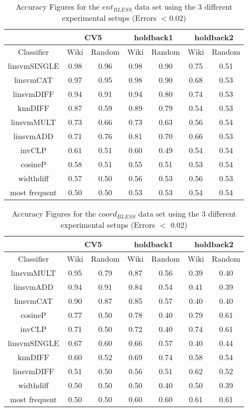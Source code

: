 \documentclass[11pt]{article}
\begin{document}
\begin{table*}[ht]
\centering
\begin{tabular}{|c|c|c|c|c|c|c|}
\hline
&\multicolumn{2}{|c|}{CV5}&\multicolumn{2}{|c|}{holdback1}&\multicolumn{2}{|c|}{holdback2}\\
\hline
Classifier&Wiki&Random&Wiki&Random&Wiki&Random\\
\hline
linsvmSINGLE&0.98&0.96&0.98&0.90&0.75&0.51\\
linsvmCAT&0.97&0.95&0.98&0.90&0.68&0.53\\
linsvmDIFF&0.94&0.91&0.94&0.80&0.74&0.53\\
knnDIFF&0.87&0.59&0.89&0.79&0.54&0.53\\
linsvmMULT&0.73&0.66&0.73&0.63&0.56&0.54\\
linsvmADD&0.71&0.76&0.81&0.70&0.66&0.53\\
invCLP&0.61&0.51&0.60&0.49&0.54&0.54\\
cosineP&0.58&0.51&0.55&0.51&0.53&0.54\\
widthdiff&0.57&0.50&0.56&0.53&0.56&0.53\\
most frequent&0.50&0.50&0.53&0.53&0.54&0.54\\
\hline
\end{tabular}
\caption{Accuracy Figures for the \emph{$ent_{BLESS}$} data set using the 3 different experimental setups (Errors $< $0.02)}
\label{table:results_ent_bless}
\end{table*}

\begin{table*}[ht]
\centering
\begin{tabular}{|c|c|c|c|c|c|c|}
\hline
&\multicolumn{2}{|c|}{CV5}&\multicolumn{2}{|c|}{holdback1}&\multicolumn{2}{|c|}{holdback2}\\
\hline
Classifier&Wiki&Random&Wiki&Random&Wiki&Random\\
\hline
linsvmMULT&0.95&0.79&0.87&0.56&0.39&0.40\\
linsvmADD&0.94&0.91&0.84&0.54&0.41&0.39\\
linsvmCAT&0.90&0.87&0.85&0.57&0.40&0.40\\
cosineP&0.77&0.50&0.78&0.40&0.79&0.61\\
invCLP&0.71&0.50&0.72&0.40&0.74&0.61\\
linsvmSINGLE&0.67&0.60&0.66&0.57&0.40&0.44\\
knnDIFF&0.60&0.52&0.69&0.74&0.58&0.54\\
linsvmDIFF&0.51&0.50&0.56&0.51&0.62&0.52\\
widthdiff&0.50&0.50&0.50&0.40&0.50&0.39\\
most frequent&0.50&0.50&0.60&0.60&0.61&0.61\\
\hline
\end{tabular}
\caption{Accuracy Figures for the \emph{$coord_{BLESS}$} data set using the 3 different experimental setups (Errors $<$ 0.02)}
\label{table:results_coord_bless}
\end{table*}
\end{document}
